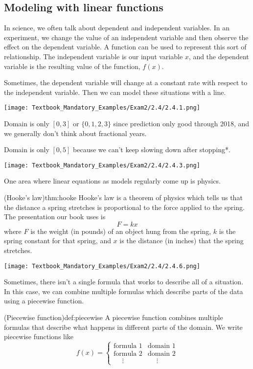 \documentclass{article}
\begin{document}
\setcounter{section}{2}
\setcounter{subsection}{3}

\subsection{Modeling with linear functions}

In science, we often talk about dependent and independent variables. In an experiment, we change the value of an independent variable and then observe the effect on the dependent variable.
A function can be used to represent this sort of relationship. The independent variable is our input variable $x$, and the dependent variable is the resulting value of the function, $f(x)$.

Sometimes, the dependent variable will change at a constant rate with respect to the independent variable. Then we can model these situations with a line.

\texttt{[image: Textbook\_Mandatory\_Examples/Exam2/2.4/2.4.1.png]}

Domain is only $[0,3]$ or $\{0,1,2,3\}$ since prediction only good through 2018, and we generally don't think about fractional years.

Domain is only $[0,5]$ because we can't keep slowing down after stopping*.

\texttt{[image: Textbook\_Mandatory\_Examples/Exam2/2.4/2.4.3.png]}

One area where linear equations as models regularly come up is physics.

\begin{thm}{(Hooke's law)}{thm:hooke}
    Hooke's law is a theorem of physics which tells us that the distance a spring stretches is proportional to the force applied to the spring. The presentation our book uses is \[F=kx\] where $F$ is the weight (in pounds) of an object hung from the spring, $k$ is the spring constant for that spring, and $x$ is the distance (in inches) that the spring stretches.
\end{thm}

\texttt{[image: Textbook\_Mandatory\_Examples/Exam2/2.4/2.4.6.png]}

Sometimes, there isn't a single formula that works to describe all of a situation. In this case, we can combine multiple formulas which describe parts of the data using a piecewise function.

\begin{definition}{(Piecewise function)}{def:piecewise}
    A piecewise function combines multiple formulas that describe what happens in different parts of the domain. We write piecewise functions like \[f(x)=\begin{cases}\text{formula 1}&\text{domain 1}\\\text{formula 2}&\text{domain 2}\\\quad\;\vdots&\;\quad\vdots\end{cases}\]
\end{definition}
\end{document}

